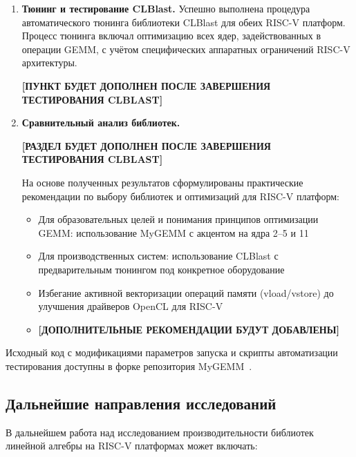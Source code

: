 \begin{enumerate}
    \item \textbf{Тюнинг и тестирование CLBlast.} Успешно выполнена процедура автоматического тюнинга библиотеки CLBlast для обеих RISC-V платформ. Процесс тюнинга включал оптимизацию всех ядер, задействованных в операции GEMM, с учётом специфических аппаратных ограничений RISC-V архитектуры.
    
    \textbf{[ПУНКТ БУДЕТ ДОПОЛНЕН ПОСЛЕ ЗАВЕРШЕНИЯ ТЕСТИРОВАНИЯ CLBLAST]}
    
    \item \textbf{Сравнительный анализ библиотек.} 
    
    \textbf{[РАЗДЕЛ БУДЕТ ДОПОЛНЕН ПОСЛЕ ЗАВЕРШЕНИЯ ТЕСТИРОВАНИЯ CLBLAST]}
    
    На основе полученных результатов сформулированы практические рекомендации по выбору библиотек и оптимизаций для RISC-V платформ:
    \begin{itemize}
        \item Для образовательных целей и понимания принципов оптимизации GEMM: использование MyGEMM с акцентом на ядра 2--5 и 11
        \item Для производственных систем: использование CLBlast с предварительным тюнингом под конкретное оборудование
        \item Избегание активной векторизации операций памяти (vload/vstore) до улучшения драйверов OpenCL для RISC-V
        \item \textbf{[ДОПОЛНИТЕЛЬНЫЕ РЕКОМЕНДАЦИИ БУДУТ ДОБАВЛЕНЫ]}
    \end{itemize}
\end{enumerate}

Исходный код с модификациями параметров запуска и скрипты автоматизации тестирования доступны в форке репозитория MyGEMM~\cite{mygemm_repo_test}.

\subsection*{Дальнейшие направления исследований}

В дальнейшем работа над исследованием производительности библиотек линейной алгебры на RISC-V платформах может включать:

